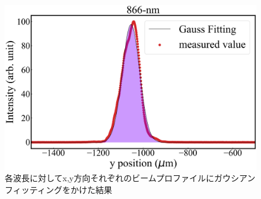 \begin{figure}[h]
\begin{center}
\begin{minipage}{0.48\linewidth}
\begin{center}
		\includegraphics[width = 0.98\columnwidth]{./experimental_setup/figure/866GaussianFittingYpos.jpg}
	\end{center}
	\end{minipage}
	\caption{各波長に対してx,y方向それぞれのビームプロファイルにガウシアンフィッティングをかけた結果}
	\label{fig:GaussianFitting}
	\end{center}
\end{figure}